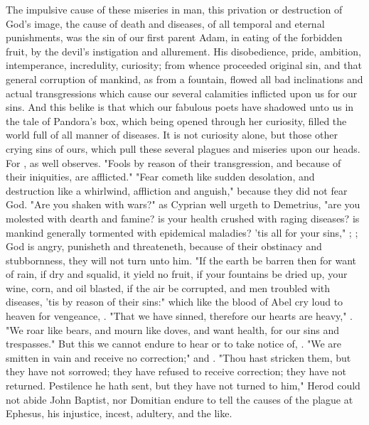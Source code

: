 The impulsive cause of these miseries in man, this privation or destruction of
God's image, the cause of death and diseases, of all temporal and eternal
punishments, was the sin of our first parent Adam, in
eating of the forbidden fruit, by the devil's instigation and allurement. His
disobedience, pride, ambition, intemperance, incredulity, curiosity; from
whence proceeded original sin, and that general corruption of mankind, as from
a fountain, flowed all bad inclinations and actual transgressions which cause
our several calamities inflicted upon us for our sins. And this belike is that
which our fabulous poets have shadowed unto us in the tale of
Pandora's box, which being opened through her curiosity,
filled the world full of all manner of diseases. It is not curiosity alone, but
those other crying sins of ours, which pull these several plagues and miseries
upon our heads. For , as
\Chrysostom{} well observes. "Fools by
reason of their transgression, and because of their iniquities, are afflicted."
"Fear cometh like sudden desolation, and destruction like a
whirlwind, affliction and anguish," because they did not fear God.
"Are you shaken with wars?" as Cyprian well urgeth to
Demetrius, "are you molested with dearth and famine? is your health crushed
with raging diseases? is mankind generally tormented with epidemical maladies?
'tis all for your sins," ; ;
 God is angry, punisheth and threateneth, because of
their obstinacy and stubbornness, they will not turn unto him.
"If the earth be barren then for want of rain, if dry and
squalid, it yield no fruit, if your fountains be dried up, your wine, corn, and
oil blasted, if the air be corrupted, and men troubled with diseases, 'tis by
reason of their sins:" which like the blood of Abel cry loud to heaven for
vengeance, . "That we have sinned, therefore our
hearts are heavy," . "We roar like bears, and
mourn like doves, and want health, \etc{} for our sins and trespasses." But
this we cannot endure to hear or to take notice of, .
"We are smitten in vain and receive no correction;" and . "Thou hast stricken them, but they have not sorrowed; they have refused to
receive correction; they have not returned. Pestilence he hath sent, but they
have not turned to him,"  Herod
could not abide John Baptist, nor Domitian endure
\Apollonius{} to tell the causes of the plague at Ephesus, his injustice, incest,
adultery, and the like.

